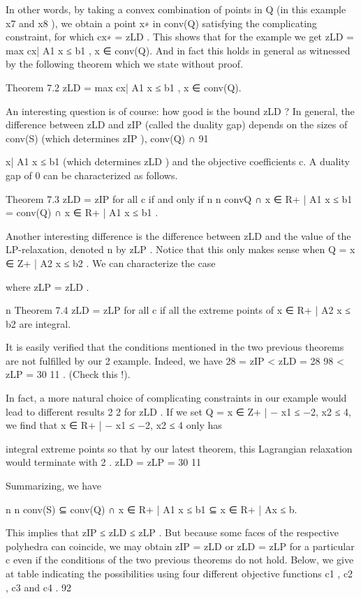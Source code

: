 \documentclass[titlepage]{book}
\theoremstyle{plain}
\theoremstyle{definition}
\theoremstyle{remark}
\begin{document}
In other words, by taking a convex combination of points in Q (in this example x7 and x8 ), we obtain a
point x∗ in conv(Q) satisfying the complicating constraint, for which cx∗ = zLD . This shows that for the
example we get zLD = max {cx| A1 x ≤ b1 , x ∈ conv(Q)}. And in fact this holds in general as witnessed
by the following theorem which we state without proof.

Theorem 7.2
zLD = max {cx| A1 x ≤ b1 , x ∈ conv(Q)}.

An interesting question is of course: how good is the bound zLD ? In general, the difference between
zLD and zIP (called the duality gap) depends on the sizes of conv(S) (which determines zIP ), conv(Q) ∩
91

{x| A1 x ≤ b1 } (which determines zLD ) and the objective coefficients c. A duality gap of 0 can be
characterized as follows.

Theorem 7.3 zLD = zIP for all c if and only if
n
n
conv{Q ∩ {x ∈ R+
| A1 x ≤ b1 }} = conv(Q) ∩ {x ∈ R+
| A1 x ≤ b1 }.

Another interesting difference is the difference between zLD and the value of the LP-relaxation, denoted
n
by zLP . Notice that this only makes sense when Q = {x ∈ Z+
| A2 x ≤ b2 }. We can characterize the case

where zLP = zLD .

n
Theorem 7.4 zLD = zLP for all c if all the extreme points of {x ∈ R+
| A2 x ≤ b2 } are integral.

It is easily verified that the conditions mentioned in the two previous theorems are not fulfilled by our
2
example. Indeed, we have 28 = zIP < zLD = 28 98 < zLP = 30 11
. (Check this !).

In fact, a more natural choice of complicating constraints in our example would lead to different results
2
2
for zLD . If we set Q = {x ∈ Z+
| − x1 ≤ −2, x2 ≤ 4}, we find that {x ∈ R+
| − x1 ≤ −2, x2 ≤ 4} only has

integral extreme points so that by our latest theorem, this Lagrangian relaxation would terminate with
2
.
zLD = zLP = 30 11

Summarizing, we have

n
n
conv(S) ⊆ conv(Q) ∩ {x ∈ R+
| A1 x ≤ b1 } ⊆ {x ∈ R+
| Ax ≤ b}.

This implies that zIP ≤ zLD ≤ zLP . But because some faces of the respective polyhedra can coincide,
we may obtain zIP = zLD or zLD = zLP for a particular c even if the conditions of the two previous
theorems do not hold. Below, we give at table indicating the possibilities using four different objective
functions c1 , c2 , c3 and c4 .
92
\end{document}
